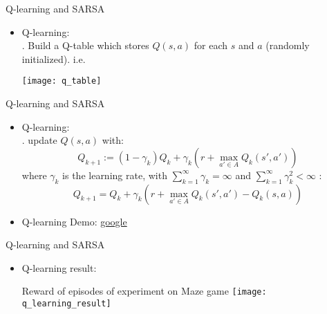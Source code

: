 \begin{frame}{Q-learning and SARSA}
    \begin{itemize}
        \item Q-learning:\\
        \bigskip
        \hspace{0.5cm} .  Build a Q-table which stores $Q(s,a)$ for each $s$ and $a$ (randomly initialized). i.e.\\
        \begin{center}\texttt{[image: q\_table]}\end{center}
        
    \end{itemize}
\end{frame}

\begin{frame}{Q-learning and SARSA}
    \begin{itemize}
        \item Q-learning:\\
        \bigskip
        \hspace{0.5cm} . update $Q(s,a)$ with:\\
        \begin{equation}
            Q_{k+1}:=(1-\gamma_{k})Q_{k}+\gamma_{k}(r+\max\limits_{a' \in A}Q_{k}(s',a'))
        \end{equation}
        \hspace{0.7cm} where $\gamma_{k}$ is the learning rate, with $\sum_{k=1}^{\infty}\gamma_{k}=\infty$ and $\sum_{k=1}^{\infty}\gamma^2_{k}<\infty $ :\\
        \begin{equation}
            Q_{k+1}=Q_{k}+\gamma_{k}(r+\max\limits_{a' \in A}Q_{k}(s',a')-Q_{k}(s,a))
        \end{equation}
        \item Q-learning Demo: \href{https://www.google.com.hk}{google} \\
        
    \end{itemize}
\end{frame}

\begin{frame}{Q-learning and SARSA}
    \begin{itemize}
        \item Q-learning result:\\
        \begin{center}Reward of episodes of experiment on Maze game \texttt{[image: q\_learning\_result]}\end{center}

    \end{itemize}
\end{frame}

